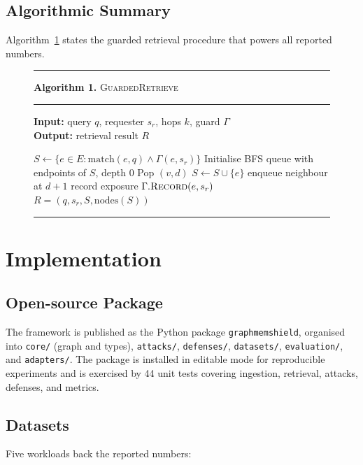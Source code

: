 \documentclass[journal,10pt,twocolumn]{IEEEtran}
\begin{document}
\subsection{Algorithmic Summary}
Algorithm~\ref{alg:retrieve} states the guarded retrieval procedure
that powers all reported numbers.

\begin{figure}[t]
\hrule\vspace{2pt}
\noindent\textbf{Algorithm 1.} \textsc{GuardedRetrieve}\\
\hrule\vspace{2pt}
\textbf{Input:} query $q$, requester $s_r$, hops $k$, guard $\Gamma$\\
\textbf{Output:} retrieval result $R$
\begin{algorithmic}[1]
    \STATE $S \gets \{ e \in E : \mathrm{match}(e, q) \land \Gamma(e, s_r) \}$
    \STATE Initialise BFS queue with endpoints of $S$, depth $0$
        \STATE Pop $(v, d)$
            \STATE $S \gets S \cup \{e\}$
            \STATE enqueue neighbour at $d{+}1$
        \ENDFOR
    \ENDWHILE
        \STATE record exposure $\Gamma.\textsc{Record}(e, s_r)$
    \ENDFOR
    \RETURN $R = (q, s_r, S, \mathrm{nodes}(S))$
\end{algorithmic}
\hrule
\label{alg:retrieve}
\end{figure}

\section{Implementation}
\label{sec:impl}

\subsection{Open-source Package}
The framework is published as the Python package
\texttt{graphmemshield}, organised into \texttt{core/}
(graph and types), \texttt{attacks/}, \texttt{defenses/},
\texttt{datasets/}, \texttt{evaluation/}, and \texttt{adapters/}. The
package is installed in editable mode for reproducible experiments
and is exercised by 44 unit tests covering ingestion, retrieval,
attacks, defenses, and metrics.

\subsection{Datasets}
Five workloads back the reported numbers:
\end{document}
